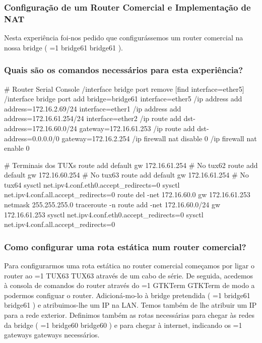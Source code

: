 \documentclass[11pt,a4paper,twocolumn]{article}
\newcommand{\hl}[2][1]{%
  \ifnum#1=1\relax
    \textcolor{text-hl1}{#2}%
  \else
    \textcolor{text-hl2}{#2}%
  \fi
}
\begin{document}
\subsubsection{Configuração de um Router Comercial e Implementação de NAT}

Nesta experiência foi-nos pedido que configurássemos um router comercial na nossa bridge (\hl{bridge61}).

\subsubsection{Quais são os comandos necessários para esta experiência?}

\begin{bash-darktheme}
    # Router Serial Console
    /interface bridge port remove [find interface=ether5]
    /interface bridge port add bridge=bridge61 interface=ether5
    /ip address add address=172.16.2.69/24 interface=ether1
    /ip address add address=172.16.61.254/24 interface=ether2
    /ip route add dst-address=172.16.60.0/24 gateway=172.16.61.253
    /ip route add dst-address=0.0.0.0/0 gateway=172.16.2.254 
    /ip firewall nat disable 0
    /ip firewall nat enable 0

    # Terminais dos TUXs
    route add default gw 172.16.61.254 # No tux62
    route add default gw 172.16.60.254 # No tux63
    route add default gw 172.16.61.254 # No tux64    
    sysctl net.ipv4.conf.eth0.accept_redirects=0 
    sysctl net.ipv4.conf.all.accept_redirects=0 
    route del -net 172.16.60.0 gw 172.16.61.253 netmask 255.255.255.0
    traceroute -n
    route add -net 172.16.60.0/24 gw 172.16.61.253
    sysctl net.ipv4.conf.eth0.accept_redirects=0 
    sysctl net.ipv4.conf.all.accept_redirects=0 

\end{bash-darktheme}

\subsubsection{Como configurar uma rota estática num router comercial?}

Para configurarmos uma rota estática no router comercial começamos por ligar o router ao \hl{TUX63} através de um cabo de série. De seguida, acedemos à consola de comandos do router através do \hl{GTKTerm} de modo a podermos configuar o router. Adicioná-mo-lo à bridge pretendida (\hl[2]{bridge61}) e atribuimos-lhe um IP na LAN. Temos também de lhe atribuir um IP para a rede exterior. Definimos também as rotas necessárias para chegar às redes da bridge (\hl[2]{bridge60}) e para chegar à internet, indicando os \hl{gateways} necessários.
\end{document}
